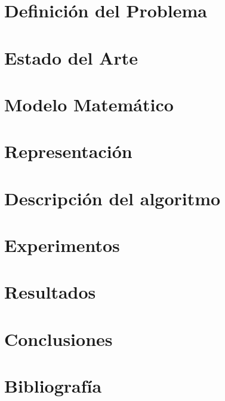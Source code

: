 \documentclass[letter, 10pt]{article}
\begin{document}
\section{Definición del Problema}
\label{sec:definicion}


\section{Estado del Arte}
\label{sec:estado}


\section{Modelo Matemático}
\label{sec:modelo}



\section{Representación}
\label{sec:representacion}


\section{Descripción del algoritmo}
\label{sec:descripcionAlgoritmo}


\section{Experimentos}
\label{sec:experimentos}


\section{Resultados}
\label{sec:resultados}


\section{Conclusiones}
\label{sec:conclusiones}



\section{Bibliografía}

\end{document}
